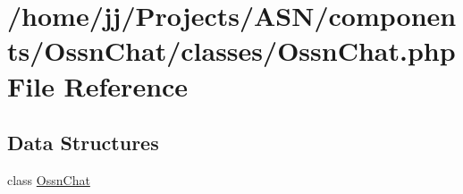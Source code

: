 \hypertarget{classes_2_ossn_chat_8php}{}\section{/home/jj/\+Projects/\+A\+S\+N/components/\+Ossn\+Chat/classes/\+Ossn\+Chat.php File Reference}
\label{classes_2_ossn_chat_8php}
\subsection*{Data Structures}
\begin{DoxyCompactItemize}
\item 
class \hyperlink{class_ossn_chat}{Ossn\+Chat}
\end{DoxyCompactItemize}
